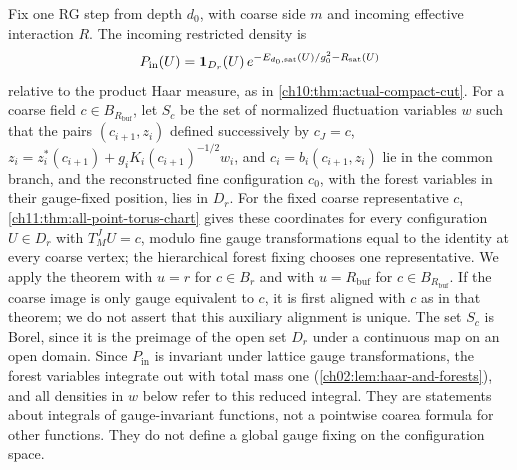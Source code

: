Fix one RG step from depth $d_0$, with coarse side $m$ and incoming effective interaction $R$. The incoming restricted density is
\[
 P_{\mathrm{in}}(U)=\mathbf 1_{D_r}(U)\,e^{-E_{d_0,\mathrm{sat}}(U)/g_0^2-R_{\mathrm{sat}}(U)}
\]
relative to the product Haar measure, as in \cref{ch10:thm:actual-compact-cut}. For a coarse field $c\in B_{R_{\mathrm{buf}}}$, let $S_c$ be the set of normalized fluctuation variables $w$ such that the pairs $(c_{i+1},z_i)$ defined successively by $c_J=c$, $z_i=z_i^*(c_{i+1})+g_iK_i(c_{i+1})^{-1/2}w_i$, and $c_i=b_i(c_{i+1},z_i)$ lie in the common branch, and the reconstructed fine configuration $c_0$, with the forest variables in their gauge-fixed position, lies in $D_r$. For the fixed coarse representative $c$, \cref{ch11:thm:all-point-torus-chart} gives these coordinates for every configuration $U\in D_r$ with $T_M^JU=c$, modulo fine gauge transformations equal to the identity at every coarse vertex; the hierarchical forest fixing chooses one representative. We apply the theorem with $u=r$ for $c\in B_r$ and with $u=R_{\mathrm{buf}}$ for $c\in B_{R_{\mathrm{buf}}}$. If the coarse image is only gauge equivalent to $c$, it is first aligned with $c$ as in that theorem; we do not assert that this auxiliary alignment is unique. The set $S_c$ is Borel, since it is the preimage of the open set $D_r$ under a continuous map on an open domain. Since $P_{\mathrm{in}}$ is invariant under lattice gauge transformations, the forest variables integrate out with total mass one (\cref{ch02:lem:haar-and-forests}), and all densities in $w$ below refer to this reduced integral. They are statements about integrals of gauge-invariant functions, not a pointwise coarea formula for other functions. They do not define a global gauge fixing on the configuration space.

